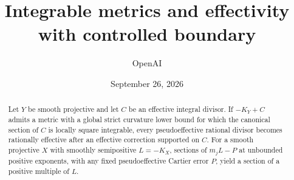 \documentclass[11pt,reqno]{amsart}
\title{Integrable metrics and effectivity with controlled boundary}
\author{OpenAI}
\date{September 26, 2026}
\numberwithin{equation}{section}
\theoremstyle{definition}
\begin{document}
\raggedbottom
\begin{abstract}
Let $Y$ be smooth projective and let $C$ be an effective integral divisor.
If $-K_Y+C$ admits a metric with a global strict curvature lower bound
for which the canonical section of $C$ is locally square integrable,
every pseudoeffective rational divisor becomes rationally effective
after an effective correction supported on $C$.
For a smooth projective $X$ with smoothly semipositive $L=-K_X$,
sections of $m_jL-P$ at unbounded positive exponents, with any fixed
pseudoeffective Cartier error $P$, yield a section of a positive
multiple of $L$.
\end{abstract}
\maketitle
\tableofcontents












\end{document}
